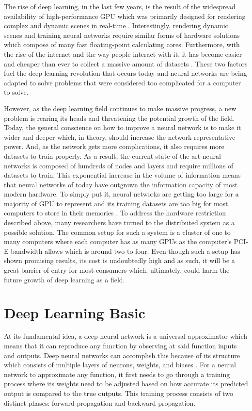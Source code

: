 \documentclass{IEEEtran}
\begin{document}
        The rise of deep learning, in the last few years, is the result of the widespread availability of high-performance GPU which was primarily designed for rendering complex and dynamic scenes in real-time \cite{nickolls_dally_2010}. Interestingly, rendering dynamic scenes and training neural networks require similar forms of hardware solutions which compose of many fast floating-point calculating cores. Furthermore, with the rise of the internet and the way people interact with it, it has become easier and cheaper than ever to collect a massive amount of datasets \cite{deng_dong_socher_li_li_fei-fei_2009}. These two factors fuel the deep learning revolution that occurs today and neural networks are being adapted to solve problems that were considered too complicated for a computer to solve.

        However, as the deep learning field continues to make massive progress, a new problem is rearing its heads and threatening the potential growth of the field. Today, the general conscience on how to improve a neural network is to make it wider and deeper which, in theory, should increase the network representative power. And, as the network gets more complications, it also requires more datasets to train properly. As a result, the current state of the art neural networks is composed of hundreds of nodes and layers and require millions of datasets to train. This exponential increase in the volume of information means that neural networks of today have outgrown the information capacity of most modern hardware. To simply put it, neural networks are getting too large for a majority of GPU to represent and its training datasets are too big for most computers to store in their memories \cite{ben-nun_hoefler_2019}. To address the hardware restriction described above, many researchers have turned to the distributed system as a possible solution. The common setup for such a system is a cluster of one to many computers where each computer has as many GPUs as the computer's PCI-E bandwidth allows which is around two to four.  Even though such a setup has shown promising results, its cost is undoubtedly high and as such, it will be a great barrier of entry for most consumers which, ultimately, could harm the future growth of deep learning as a field.
        
    \section{Deep Learning Basic}
        At its fundamental idea, a deep neural network is a universal approximator which means that it can reproduce any function by observing at said function inputs and outputs. Deep neural networks can accomplish this because of its structure which consists of multiple layers of neurons, weights, and biases \cite{hornik_1991}. For a neural network to approximate any function, it first needs to go through a training process where its weights need to be adjusted based on how accurate its predicted output is compared to the true outputs. This training process consists of two distinct phases: forward propagation and backward propagation. 
\end{document}
